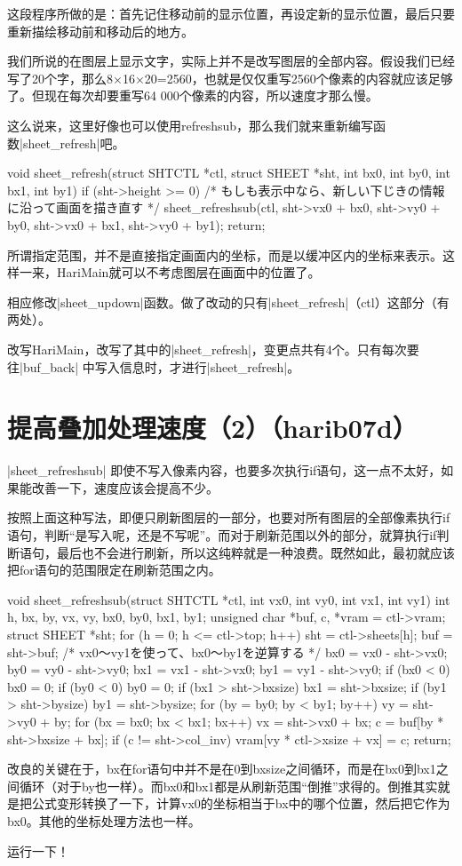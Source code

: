 这段程序所做的是：首先记住移动前的显示位置，再设定新的显示位置，最后只要重新描绘移动前和移动后的地方。

\cs

我们所说的在图层上显示文字，实际上并不是改写图层的全部内容。假设我们已经写了20个字，那么8×16×20=2560，也就是仅仅重写2560个像素的内容就应该足够了。但现在每次却要重写64 000个像素的内容，所以速度才那么慢。

这么说来，这里好像也可以使用refreshsub，那么我们就来重新编写函数|sheet_refresh|吧。

\begin{code}
void sheet_refresh(struct SHTCTL *ctl, struct SHEET *sht, int bx0, int by0, int bx1, int by1)
{
	if (sht->height >= 0) { /* もしも表示中なら、新しい下じきの情報に沿って画面を描き直す */
		sheet_refreshsub(ctl, sht->vx0 + bx0, sht->vy0 + by0, sht->vx0 + bx1, sht->vy0 + by1);
	}
	return;
}
\end{code}

所谓指定范围，并不是直接指定画面内的坐标，而是以缓冲区内的坐标来表示。这样一来，HariMain就可以不考虑图层在画面中的位置了。

相应修改|sheet_updown|函数。做了改动的只有|sheet_refresh|（ctl）这部分（有两处）。

改写HariMain，改写了其中的|sheet_refresh|，变更点共有4个。只有每次要往|buf_back| 中写入信息时，才进行|sheet_refresh|。


\section{	提高叠加处理速度（2）（harib07d）	}
|sheet_refreshsub| 即使不写入像素内容，也要多次执行if语句，这一点不太好，如果能改善一下，速度应该会提高不少。

按照上面这种写法，即便只刷新图层的一部分，也要对所有图层的全部像素执行if语句，判断“是写入呢，还是不写呢”。而对于刷新范围以外的部分，就算执行if判断语句，最后也不会进行刷新，所以这纯粹就是一种浪费。既然如此，最初就应该把for语句的范围限定在刷新范围之内。

\begin{code}
void sheet_refreshsub(struct SHTCTL *ctl, int vx0, int vy0, int vx1, int vy1)
{
	int h, bx, by, vx, vy, bx0, by0, bx1, by1;
	unsigned char *buf, c, *vram = ctl->vram;
	struct SHEET *sht;
	for (h = 0; h <= ctl->top; h++) {
		sht = ctl->sheets[h];
		buf = sht->buf;
		/* vx0～vy1を使って、bx0～by1を逆算する */
		bx0 = vx0 - sht->vx0;
		by0 = vy0 - sht->vy0;
		bx1 = vx1 - sht->vx0;
		by1 = vy1 - sht->vy0;
		if (bx0 < 0) { bx0 = 0; }
		if (by0 < 0) { by0 = 0; }
		if (bx1 > sht->bxsize) { bx1 = sht->bxsize; }
		if (by1 > sht->bysize) { by1 = sht->bysize; }
		for (by = by0; by < by1; by++) {
			vy = sht->vy0 + by;
			for (bx = bx0; bx < bx1; bx++) {
				vx = sht->vx0 + bx;
				c = buf[by * sht->bxsize + bx];
				if (c != sht->col_inv) {
					vram[vy * ctl->xsize + vx] = c;
				}
			}
		}
	}
	return;
}
\end{code}

改良的关键在于，bx在for语句中并不是在0到bxsize之间循环，而是在bx0到bx1之间循环（对于by也一样）。而bx0和bx1都是从刷新范围“倒推”求得的。倒推其实就是把公式变形转换了一下，计算vx0的坐标相当于bx中的哪个位置，然后把它作为bx0。其他的坐标处理方法也一样。

运行一下！